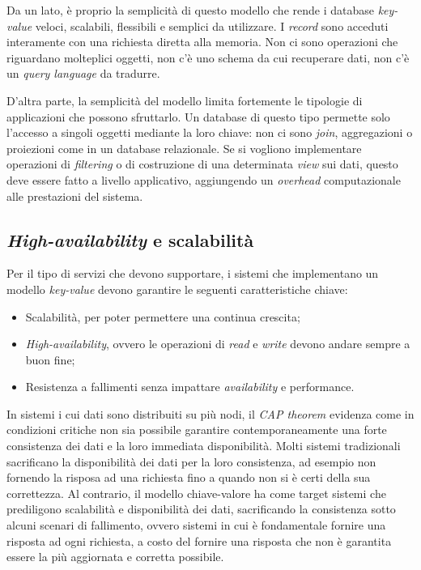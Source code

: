 Da un lato, è proprio la semplicità di questo modello che rende i database \textit{key-value} veloci, scalabili, flessibili e semplici da utilizzare. I \textit{record} sono acceduti interamente con una richiesta diretta alla memoria. Non ci sono operazioni che riguardano molteplici oggetti, non c'è uno schema da cui recuperare dati, non c'è un \textit{query language} da tradurre.

D'altra parte, la semplicità del modello limita fortemente le tipologie di applicazioni che possono sfruttarlo. Un database di questo tipo permette solo l'accesso a singoli oggetti mediante la loro chiave: non ci sono \textit{join}, aggregazioni o proiezioni come in un database relazionale. Se si vogliono implementare operazioni di \textit{filtering} o di costruzione di una determinata \textit{view} sui dati, questo deve essere fatto a livello applicativo, aggiungendo un \textit{overhead} computazionale alle prestazioni del sistema.



\subsection{\textit{High-availability} e scalabilità}
Per il tipo di servizi che devono supportare, i sistemi che implementano un modello \textit{key-value} devono garantire le seguenti caratteristiche chiave:
\begin{itemize}
    \item Scalabilità, per poter permettere una continua crescita;
    \item \textit{High-availability}, ovvero le operazioni di \textit{read} e \textit{write} devono andare sempre a buon fine;
    \item Resistenza a fallimenti senza impattare \textit{availability} e performance.
\end{itemize}

In sistemi i cui dati sono distribuiti su più nodi, il \textit{CAP theorem} evidenza come in condizioni critiche non sia possibile garantire contemporaneamente una forte consistenza dei dati e la loro immediata disponibilità. Molti sistemi tradizionali sacrificano la disponibilità dei dati per la loro consistenza, ad esempio non fornendo la risposa ad una richiesta fino a quando non si è certi della sua correttezza. Al contrario, il modello chiave-valore ha come target sistemi che prediligono scalabilità e disponibilità dei dati, sacrificando la consistenza sotto alcuni scenari di fallimento, ovvero sistemi in cui è fondamentale fornire una risposta ad ogni richiesta, a costo del fornire una risposta che non è garantita essere la più aggiornata e corretta possibile.

